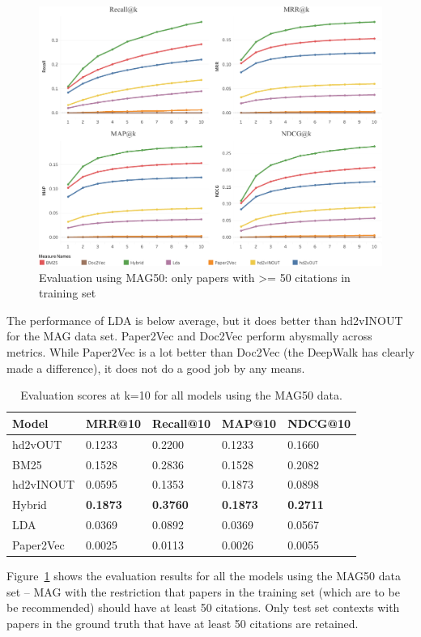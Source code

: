 \begin{figure}
    \centering
    \includegraphics[keepaspectratio, width=.9\linewidth]{figures/Evaluation/MAG50MetricsGraph.pdf}
    \caption{Evaluation using MAG50: only papers with >= 50 citations in training set}
    \label{fig:mag50evaluation}
\end{figure}

The performance of LDA is below average, but it does better than hd2vINOUT for the MAG data set. Paper2Vec and Doc2Vec perform abysmally across metrics. While Paper2Vec is a lot better than Doc2Vec (the DeepWalk has clearly made a difference), it does not do a good job by any means.
\begin{table}[]
\centering
    \caption{Evaluation scores at k=10 for all models using the MAG50 data.}
    \label{tab:mag50evalk10}
\begin{center}
    \begin{tabular}{lllll}
    \toprule
    Model & MRR@10 & Recall@10 & MAP@10 & NDCG@10 \\
    \midrule
    hd2vOUT  & 0.1233 & 0.2200 & 0.1233 & 0.1660 \\
    BM25       & 0.1528 & 0.2836 & 0.1528 & 0.2082 \\
    hd2vINOUT & 0.0595 & 0.1353 & 0.1873 & 0.0898 \\
    Hybrid  & \textbf{0.1873} & \textbf{0.3760} & \textbf{0.1873} & \textbf{0.2711} \\
    LDA     & 0.0369 & 0.0892 & 0.0369 & 0.0567 \\
    Paper2Vec        & 0.0025 & 0.0113 & 0.0026 & 0.0055 \\
    \bottomrule
    \end{tabular}
\end{center}
\end{table}
Figure~\ref{fig:mag50evaluation} shows the evaluation results for all the models using the MAG50 data set -- MAG with the restriction that papers in the training set (which are to be be recommended) should have at least 50 citations. Only test set contexts with papers in the ground truth that have at least 50 citations are retained.

